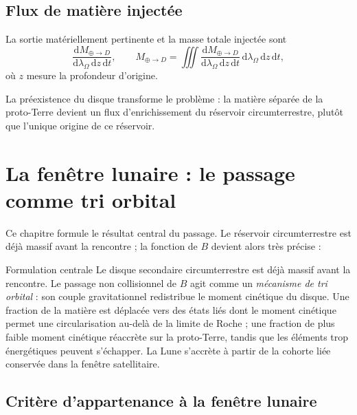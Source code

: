 \documentclass[11pt,a4paper,openany]{report}
\newcommand{\dd}{\mathrm{d}}
\begin{document}
\section{Flux de matière injectée}

La sortie matériellement pertinente et la masse totale injectée sont
\begin{equation}
\frac{\dd M_{\oplus\to D}}{\dd\lambda_\Omega\,\dd z\,\dd t},
\qquad
M_{\oplus\to D}=\iiint\frac{\dd M_{\oplus\to D}}{\dd\lambda_\Omega\,\dd z\,\dd t}\,
\dd\lambda_\Omega\,\dd z\,\dd t,
\label{eq:flux}
\end{equation}
où $z$ mesure la profondeur d'origine.

\begin{ideephys}
La préexistence du disque transforme le problème : la matière séparée de la proto-Terre devient
un flux d'enrichissement du réservoir circumterrestre, plutôt que l'unique origine de ce
réservoir.
\end{ideephys}


\chapter{La fenêtre lunaire : le passage comme tri orbital}
\label{ch:fenetre}

Ce chapitre formule le résultat central du passage. Le réservoir circumterrestre est déjà massif
avant la rencontre ; la fonction de $B$ devient alors très précise :

\begin{principe}{Formulation centrale}
Le disque secondaire circumterrestre est déjà massif avant la rencontre. Le passage non
collisionnel de $B$ agit comme un \emph{mécanisme de tri orbital} : son couple gravitationnel
redistribue le moment cinétique du disque. Une fraction de la matière est déplacée vers des états
liés dont le moment cinétique permet une circularisation au-delà de la limite de Roche ; une
fraction de plus faible moment cinétique réaccrète sur la proto-Terre, tandis que les éléments trop
énergétiques peuvent s'échapper. La Lune s'accrète à partir de la cohorte liée conservée dans la
fenêtre satellitaire.
\end{principe}

\section{Critère d'appartenance à la fenêtre lunaire}
\end{document}
